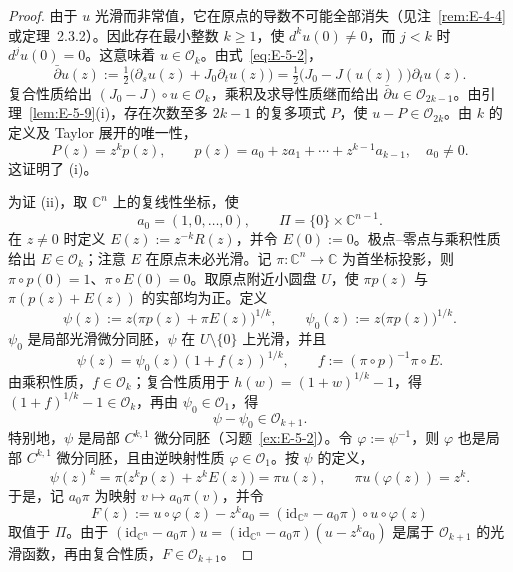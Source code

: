 \begin{proof}
由于 $u$ 光滑而非常值，它在原点的导数不可能全部消失（见注~\ref{rem:E-4-4} 或定理~2.3.2）。因此存在最小整数 $k\ge1$，使 $d^ku(0)\ne0$，而 $j<k$ 时 $d^ju(0)=0$。这意味着 $u\in\mathcal O_k$。由式~\eqref{eq:E-5-2}，
\[
  \bar\partial u(z):=\tfrac12\bigl(\partial_su(z)+J_0\partial_tu(z)\bigr)
  =\tfrac12\bigl(J_0-J(u(z))\bigr)\partial_tu(z).
\]
复合性质给出 $(J_0-J)\circ u\in\mathcal O_k$，乘积及求导性质继而给出 $\bar\partial u\in\mathcal O_{2k-1}$。由引理~\ref{lem:E-5-9}(i)，存在次数至多 $2k-1$ 的复多项式 $P$，使 $u-P\in\mathcal O_{2k}$。由 $k$ 的定义及 Taylor 展开的唯一性，
\[
  P(z)=z^kp(z),\qquad
  p(z)=a_0+za_1+\cdots+z^{k-1}a_{k-1},\quad a_0\ne0.
\]
这证明了 (i)。

为证 (ii)，取 $\mathbb C^n$ 上的复线性坐标，使
\[
  a_0=(1,0,\ldots,0),\qquad
  \Pi=\{0\}\times\mathbb C^{n-1}.
\]
在 $z\ne0$ 时定义 $E(z):=z^{-k}R(z)$，并令 $E(0):=0$。极点--零点与乘积性质给出 $E\in\mathcal O_k$；注意 $E$ 在原点未必光滑。记 $\pi:\mathbb C^n\to\mathbb C$ 为首坐标投影，则 $\pi\circ p(0)=1$、$\pi\circ E(0)=0$。取原点附近小圆盘 $U$，使 $\pi p(z)$ 与 $\pi(p(z)+E(z))$ 的实部均为正。定义
\[
  \psi(z):=z\bigl(\pi p(z)+\pi E(z)\bigr)^{1/k},
  \qquad \psi_0(z):=z\bigl(\pi p(z)\bigr)^{1/k}.
\]
$\psi_0$ 是局部光滑微分同胚，$\psi$ 在 $U\setminus\{0\}$ 上光滑，并且
\[
  \psi(z)=\psi_0(z)(1+f(z))^{1/k},\qquad
  f:=(\pi\circ p)^{-1}\pi\circ E.
\]
由乘积性质，$f\in\mathcal O_k$；复合性质用于 $h(w)=(1+w)^{1/k}-1$，得 $(1+f)^{1/k}-1\in\mathcal O_k$，再由 $\psi_0\in\mathcal O_1$，得
\[
  \psi-\psi_0\in\mathcal O_{k+1}.
\]
特别地，$\psi$ 是局部 $C^{k,1}$ 微分同胚（习题~\ref{ex:E-5-2}）。令 $\varphi:=\psi^{-1}$，则 $\varphi$ 也是局部 $C^{k,1}$ 微分同胚，且由逆映射性质 $\varphi\in\mathcal O_1$。按 $\psi$ 的定义，
\[
  \psi(z)^k=\pi\bigl(z^kp(z)+z^kE(z)\bigr)=\pi u(z),
  \qquad \pi u(\varphi(z))=z^k.
\]
于是，记 $a_0\pi$ 为映射 $v\mapsto a_0\pi(v)$，并令
\[
  F(z):=u\circ\varphi(z)-z^ka_0
       =(\mathrm{id}_{\mathbb C^n}-a_0\pi)\circ u\circ\varphi(z)
\]
取值于 $\Pi$。由于 $(\mathrm{id}_{\mathbb C^n}-a_0\pi)u=(\mathrm{id}_{\mathbb C^n}-a_0\pi)(u-z^ka_0)$ 是属于 $\mathcal O_{k+1}$ 的光滑函数，再由复合性质，$F\in\mathcal O_{k+1}$。


\end{proof}
